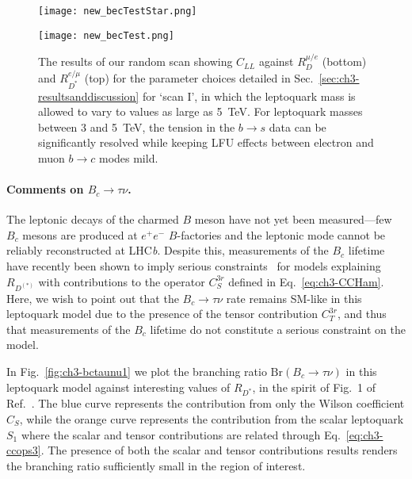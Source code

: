 \begin{figure}
  \centering
  \begin{minipage}[t]{0.6\linewidth}
    \centering \texttt{[image: new\_becTestStar.png]}
  \end{minipage}
  \hfill
  \begin{minipage}[t]{0.6\linewidth}
    \centering \texttt{[image: new\_becTest.png]}
  \end{minipage}
  \caption[The results of our random scan showing $C_{LL}$ against $R_D^{\mu/e}$
  (bottom) and $R^{e/\mu}_{D^*}$ (top) for the parameter choices detailed in
  Sec.~\ref{sec:ch3-resultsanddiscussion} for `scan I', in which the leptoquark
  mass is allowed to vary to values as large as \SI{5}{\TeV}.]{The results of
    our random scan showing $C_{LL}$ against $R_D^{\mu/e}$ (bottom) and
    $R^{e/\mu}_{D^*}$ (top) for the parameter choices detailed in
    Sec.~\ref{sec:ch3-resultsanddiscussion} for `scan I', in which the
    leptoquark mass is allowed to vary to values as large as \SI{5}{\TeV}. For
    leptoquark masses between 3 and \SI{5}{\TeV}, the tension in the $b \to s$
    data can be significantly resolved while keeping LFU effects between
    electron and muon $b \to c$ modes mild.}
  \label{fig:ch3-LFUratios}
\end{figure}

\paragraph{Comments on $B_c \to \tau \nu$.} The leptonic decays of the charmed
$B$ meson have not yet been measured---few $B_c$ mesons are produced at $e^+e^-$
$B$-factories and the leptonic mode cannot be reliably reconstructed at
LHC\textit{b}. Despite this, measurements of the $B_c$ lifetime have recently
been shown to imply serious constraints~\cite{Li:2016vvp, Alonso:2016oyd} for
models explaining $R_{D^{(*)}}$ with contributions to the operator $C_S^{3r}$
defined in Eq.~\eqref{eq:ch3-CCHam}. Here, we wish to point out that the $B_c \to
\tau \nu$ rate remains SM-like in this leptoquark model due to the presence of
the tensor contribution $C_T^{3r}$, and thus that measurements of the $B_c$
lifetime do not constitute a serious constraint on the model.

In Fig.~\ref{fig:ch3-bctaunu1} we plot the branching ratio
$\text{Br}(B_c \to \tau \nu)$ in this leptoquark model against interesting
values of $R_{D^*}$, in the spirit of Fig.~1 of Ref.~\cite{Alonso:2016oyd}. The
blue curve represents the contribution from only the Wilson coefficient $C_S$,
while the orange curve represents the contribution from the scalar leptoquark
$S_{1}$ where the scalar and tensor contributions are related through
Eq.~\eqref{eq:ch3-ccops3}. The presence of both the scalar and tensor
contributions results renders the branching ratio sufficiently small in the
region of interest.

